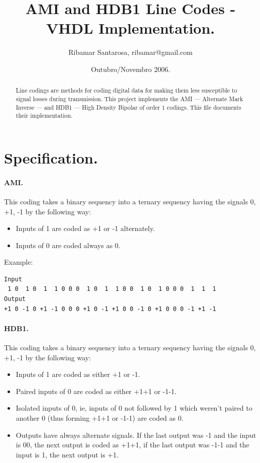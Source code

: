 \documentclass[11pt]{article}
\title{\textbf{AMI and HDB1 Line Codes - VHDL Implementation.}}
\author{Ribamar Santarosa, ribamar@gmail.com}
\date{Outubro/Novembro 2006.}
\begin{document}
\maketitle 


\begin{abstract}
Line codings are methods for coding digital data for making them 
less susceptible to signal losses during transmission. This project 
implements the AMI --- Alternate Mark Inverse --- and HDB1 --- High
Density Bipolar of order 1 codings. This file documents their
implementation. 
\end{abstract}

\section{Specification.}


\paragraph{AMI.} This coding takes a binary sequency into a
ternary sequency having the signals 0, +1, -1 by the following way: 

\begin{itemize}
\item Inputs of 1 are coded as +1 or -1 alternately.
\item Inputs of 0 are coded always as 0. 
\end{itemize}

Example: 
\begin{verbatim}
Input 
 1 0  1 0  1  1 0 0 0  1 0  1  1 0 0  1 0  1 0 0 0  1  1  1
Output
+1 0 -1 0 +1 -1 0 0 0 +1 0 -1 +1 0 0 -1 0 +1 0 0 0 -1 +1 -1
\end{verbatim}

\paragraph{HDB1.} This coding takes a binary sequency into a 
ternary sequency having the signals 0, +1, -1 by the following way:

\begin{itemize}
\item Inputs of 1 are coded as either +1 or -1.
\item Paired inputs of 0 are coded as either +1+1 or -1-1.   
\item Isolated inputs of 0, ie, inputs of 0 not followed by 1 which
weren't paired to another 0 (thus forming +1+1 or -1-1) are coded 
as 0. 
\item Outputs have always alternate signals. If the last output was
-1 and the input is 00, the next output is coded as +1+1, if the
last output was -1-1 and the input is 1, the next output is +1. 
\end{itemize}
\end{document}
